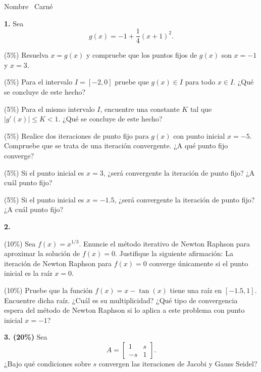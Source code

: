 \documentclass[11pt]{article}
\begin{document}
\examheader

\vspace{6pt}
\noindent Nombre \dotfill\ Carné \dotfill

\vspace{10pt}
\noindent\textbf{1.} Sea
\[
g(x)=-1+\frac{1}{4}(x+1)^2.
\]
\begin{opciones}
\item (5\%) Resuelva $x=g(x)$ y compruebe que los puntos fijos de $g(x)$ son $x=-1$ y $x=3$.
\item (5\%) Para el intervalo $I=[-2,0]$ pruebe que $g(x)\in I$ para todo $x\in I$. ¿Qué se concluye de este hecho?
\item (5\%) Para el mismo intervalo $I$, encuentre una constante $K$ tal que $|g'(x)|\leq K<1$. ¿Qué se concluye de este hecho?
\item (5\%) Realice dos iteraciones de punto fijo para $g(x)$ con punto inicial $x=-5$. Compruebe que se trata de una iteración convergente. ¿A qué punto fijo converge?
\item (5\%) Si el punto inicial es $x=3$, ¿será convergente la iteración de punto fijo? ¿A cuál punto fijo?
\item (5\%) Si el punto inicial es $x=-1.5$, ¿será convergente la iteración de punto fijo? ¿A cuál punto fijo?
\end{opciones}

\vspace{5mm}
\noindent\textbf{2.}
\begin{opciones}
\item (10\%) Sea $f(x)=x^{1/3}$. Enuncie el método iterativo de Newton Raphson para aproximar la solución de $f(x)=0$. Justifique la siguiente afirmación: La iteración de Newton Raphson para $f(x)=0$ converge únicamente si el punto inicial es la raíz $x=0$.
\item (10\%) Pruebe que la función $f(x)=x-\tan(x)$ tiene una raíz en $[-1.5,1]$. Encuentre dicha raíz. ¿Cuál es su multiplicidad? ¿Qué tipo de convergencia espera del método de Newton Raphson si lo aplica a este problema con punto inicial $x=-1$?
\end{opciones}

\vspace{5mm}
\noindent\textbf{3. (20\%)} Sea
\[
A=\begin{bmatrix} 1 & s \\ -s & 1 \end{bmatrix}.
\]
¿Bajo qué condiciones sobre $s$ convergen las iteraciones de Jacobi y Gauss Seidel?
\end{document}
